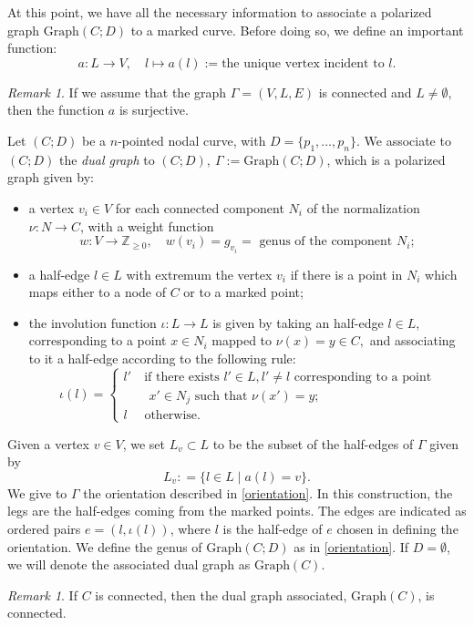 \documentclass[a4paper,12 pt,titlepage,twoside]{book}
\newcommand{\numberset}{\mathbb}
\newcommand{\Z}{\numberset{Z}}
\theoremstyle{plain}
\theoremstyle{theorem}
\theoremstyle{definition}
\theoremstyle{remark}
\newtheorem{oss}[thm]{Remark}
\begin{document}
	At this point, we have all the necessary information to associate a polarized graph $\text{Graph}(C;D)$ to a marked curve. Before doing so, we define an important function:$$a \colon L\rightarrow V, \quad l \mapsto a(l) := \text{the unique vertex incident to } l.$$
	\begin{oss}
		If we assume that the graph $\Gamma=(V,L,E)$ is connected and $L \neq \emptyset$, then the function $a$ is surjective.
	\end{oss}  
	Let $(C;D)$ be a $n$-pointed nodal curve, with $D =\{p_1, \dots,p_n\}$. We associate to $(C;D)$ the \emph{dual graph} to $(C;D),\ \Gamma := \text{Graph}(C;D)$, which is a polarized graph given by:
	\begin{itemize}
		\item a vertex $v_i \in V$ for each connected component $N_i$ of the normalization $\nu \colon N \rightarrow C$, with a weight function $$w \colon V \rightarrow \Z_{\ge 0}, \quad w(v_i) = g_{v_i} = \text{ genus of the component } N_i;$$
		\item a half-edge $l \in L$ with extremum the vertex $v_i$ if there is a point in $N_i$ which maps either to a node of $C$ or to a marked point;
		\item the involution function $\iota \colon L \rightarrow L$ is given by taking an half-edge $l \in L$, corresponding to a point $x \in N_i$ mapped to $\nu(x)=y \in C,$ and associating to it a half-edge according to the following rule:
		$$\iota(l) = \begin{cases} 
		l' \quad \text{if there exists } l' \in L, l' \neq l \text{ corresponding to a point}\\
		\qquad x' \in N_j \text{ such that } \nu(x')=y; \\
		l \quad \text{ otherwise.}
		\end{cases}$$
	\end{itemize}
	Given a vertex $v \in V$, we set $L_{v} \subset L$ to be the subset of the half-edges of $\Gamma$ given by $$L_{v} : =  \{l \in L \mid a(l)=v\}.$$
	We give to $\Gamma$ the orientation described in \ref{orientation}. In this construction, the legs are the half-edges coming from the marked points. The edges are indicated as ordered pairs $e = (l, \iota(l))$, where $l$ is the half-edge of $e$ chosen in defining the orientation. We define the genus of $\text{Graph}(C;D)$ as in \ref{orientation}. If $D = \emptyset$, we will denote the associated dual graph as $\text{Graph}(C).$
	\begin{oss}
		If $C$ is connected, then the dual graph associated, $\text{Graph}(C)$, is connected.
	\end{oss}
\end{document}
